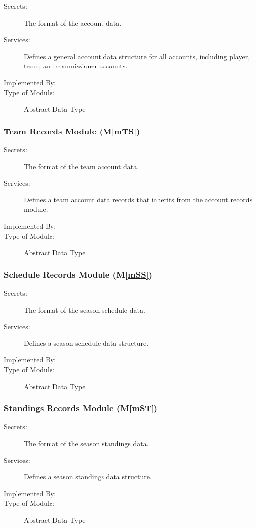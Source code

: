 \documentclass[12pt, titlepage]{article}
\newcommand{\mref}[1]{M\ref{#1}}
\begin{document}
\begin{description}
  \item[Secrets:]The format of the account data.
  \item[Services:]Defines a general account data structure for all accounts,
  including player, team, and commissioner accounts.
  \item[Implemented By:] \progname{}
  \item[Type of Module:] Abstract Data Type
\end{description}

\subsubsection{Team Records Module (\mref{mTS})}

\begin{description}
  \item[Secrets:]The format of the team account data.
  \item[Services:]Defines a team account data records that inherits from the
  account records module.
  \item[Implemented By:] \progname{}
  \item[Type of Module:] Abstract Data Type
\end{description}

\subsubsection{Schedule Records Module (\mref{mSS})}

\begin{description}
  \item[Secrets:]The format of the season schedule data.
  \item[Services:]Defines a season schedule data structure.
  \item[Implemented By:] \progname{}
  \item[Type of Module:] Abstract Data Type
\end{description}

\subsubsection{Standings Records Module (\mref{mST})}

\begin{description}
  \item[Secrets:]The format of the season standings data.
  \item[Services:]Defines a season standings data structure.
  \item[Implemented By:] \progname{}
  \item[Type of Module:] Abstract Data Type
\end{description}
\end{document}
